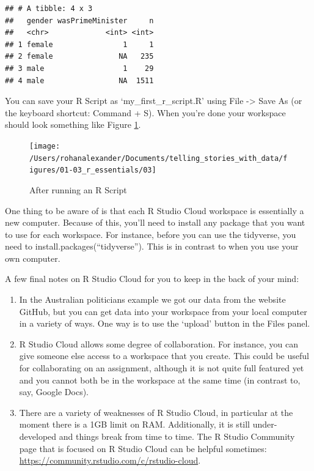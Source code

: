 \documentclass[
]{book}
\providecommand{\tightlist}{%
  \setlength{\itemsep}{0pt}\setlength{\parskip}{0pt}}
\begin{document}
\begin{verbatim}
## # A tibble: 4 x 3
##   gender wasPrimeMinister     n
##   <chr>             <int> <int>
## 1 female                1     1
## 2 female               NA   235
## 3 male                  1    29
## 4 male                 NA  1511
\end{verbatim}

You can save your R Script as `my\_first\_r\_script.R' using File -\textgreater{} Save As (or the keyboard shortcut: Command + S). When you're done your workspace should look something like Figure \ref{fig:third}.

\begin{figure}
\texttt{[image: /Users/rohanalexander/Documents/telling\_stories\_with\_data/figures/01-03\_r\_essentials/03]} \caption{After running an R Script}\label{fig:third}
\end{figure}

One thing to be aware of is that each R Studio Cloud workspace is essentially a new computer. Because of this, you'll need to install any package that you want to use for each workspace. For instance, before you can use the tidyverse, you need to install.packages(``tidyverse''). This is in contrast to when you use your own computer.

A few final notes on R Studio Cloud for you to keep in the back of your mind:

\begin{enumerate}
\def\labelenumi{\arabic{enumi})}
\tightlist
\item
  In the Australian politicians example we got our data from the website GitHub, but you can get data into your workspace from your local computer in a variety of ways. One way is to use the `upload' button in the Files panel.
\item
  R Studio Cloud allows some degree of collaboration. For instance, you can give someone else access to a workspace that you create. This could be useful for collaborating on an assignment, although it is not quite full featured yet and you cannot both be in the workspace at the same time (in contrast to, say, Google Docs).
\item
  There are a variety of weaknesses of R Studio Cloud, in particular at the moment there is a 1GB limit on RAM. Additionally, it is still under-developed and things break from time to time. The R Studio Community page that is focused on R Studio Cloud can be helpful sometimes: \url{https://community.rstudio.com/c/rstudio-cloud}.
\end{enumerate}
\end{document}
